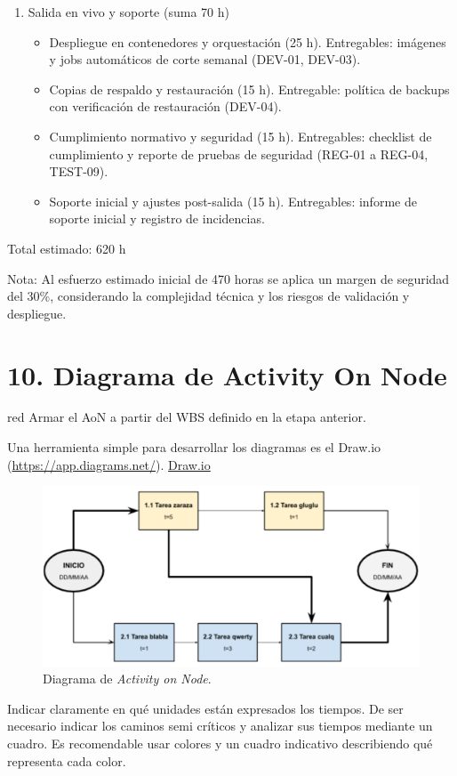 \documentclass[12pt]
{charter}
\begin{document}
\begin{enumerate}
  \item Salida en vivo y soporte (suma 70 h)
    \begin{itemize}
      \item Despliegue en contenedores y orquestación (25 h). Entregables: imágenes y jobs automáticos de corte semanal (DEV-01, DEV-03).
      \item Copias de respaldo y restauración (15 h). Entregable: política de backups con verificación de restauración (DEV-04).
      \item Cumplimiento normativo y seguridad (15 h). Entregables: checklist de cumplimiento y reporte de pruebas de seguridad (REG-01 a REG-04, TEST-09).
      \item Soporte inicial y ajustes post-salida (15 h). Entregables: informe de soporte inicial y registro de incidencias.
    \end{itemize}
\end{enumerate}

Total estimado: 620 h

Nota: Al esfuerzo estimado inicial de 470 horas se aplica un margen de seguridad del 30\%, considerando la complejidad técnica y los riesgos de validación y despliegue. 


\section{10. Diagrama de Activity On Node}
\label{sec:AoN}

\begin{consigna}{red}
Armar el AoN a partir del WBS definido en la etapa anterior.

Una herramienta simple para desarrollar los diagramas es el Draw.io (\url{https://app.diagrams.net/}).
\href{https://app.diagrams.net}{Draw.io}


\begin{figure}[htpb]
\centering 
\includegraphics[width=.8\textwidth]{./Figuras/AoN.png}
\caption{Diagrama de \textit{Activity on Node}.}
\label{fig:AoN}
\end{figure}

Indicar claramente en qué unidades están expresados los tiempos.
De ser necesario indicar los caminos semi críticos y analizar sus tiempos mediante un cuadro.
Es recomendable usar colores y un cuadro indicativo describiendo qué representa cada color.

\end{consigna}
\end{document}
